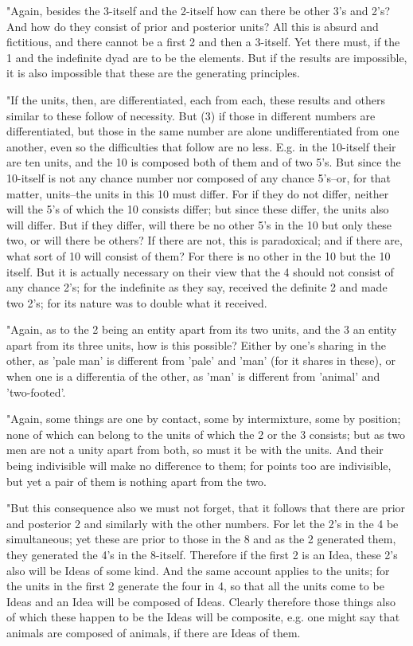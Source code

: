 "Again, besides the 3-itself and the 2-itself how can there be other
3's and 2's? And how do they consist of prior and posterior units?
All this is absurd and fictitious, and there cannot be a first 2 and
then a 3-itself. Yet there must, if the 1 and the indefinite dyad
are to be the elements. But if the results are impossible, it is also
impossible that these are the generating principles. 

"If the units, then, are differentiated, each from each, these results
and others similar to these follow of necessity. But (3) if those
in different numbers are differentiated, but those in the same number
are alone undifferentiated from one another, even so the difficulties
that follow are no less. E.g. in the 10-itself their are ten units,
and the 10 is composed both of them and of two 5's. But since the
10-itself is not any chance number nor composed of any chance 5's--or,
for that matter, units--the units in this 10 must differ. For if they
do not differ, neither will the 5's of which the 10 consists differ;
but since these differ, the units also will differ. But if they differ,
will there be no other 5's in the 10 but only these two, or will there
be others? If there are not, this is paradoxical; and if there are,
what sort of 10 will consist of them? For there is no other in the
10 but the 10 itself. But it is actually necessary on their view that
the 4 should not consist of any chance 2's; for the indefinite as
they say, received the definite 2 and made two 2's; for its nature
was to double what it received. 

"Again, as to the 2 being an entity apart from its two units, and
the 3 an entity apart from its three units, how is this possible?
Either by one's sharing in the other, as 'pale man' is different from
'pale' and 'man' (for it shares in these), or when one is a differentia
of the other, as 'man' is different from 'animal' and 'two-footed'.

"Again, some things are one by contact, some by intermixture, some
by position; none of which can belong to the units of which the 2
or the 3 consists; but as two men are not a unity apart from both,
so must it be with the units. And their being indivisible will make
no difference to them; for points too are indivisible, but yet a pair
of them is nothing apart from the two. 

"But this consequence also we must not forget, that it follows that
there are prior and posterior 2 and similarly with the other numbers.
For let the 2's in the 4 be simultaneous; yet these are prior to those
in the 8 and as the 2 generated them, they generated the 4's in the
8-itself. Therefore if the first 2 is an Idea, these 2's also will
be Ideas of some kind. And the same account applies to the units;
for the units in the first 2 generate the four in 4, so that all the
units come to be Ideas and an Idea will be composed of Ideas. Clearly
therefore those things also of which these happen to be the Ideas
will be composite, e.g. one might say that animals are composed of
animals, if there are Ideas of them. 

